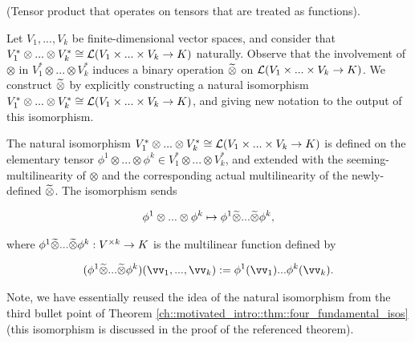\begin{deriv}
    (Tensor product that operates on tensors that are treated as functions).
    
    Let $V_1, ..., V_k$ be finite-dimensional vector spaces, and consider that $V_1^* \otimes ... \otimes V_k^* \cong \mathcal{L}(V_1 \times ... \times V_k \rightarrow K)$ naturally. Observe that the involvement of $\otimes$ in $V_1^* \otimes ... \otimes V_k^*$ induces a binary operation $\widetilde{\otimes}$ on $\mathcal{L}(V_1 \times ... \times V_k \rightarrow K)$. We construct $\widetilde{\otimes}$ by explicitly constructing a natural isomorphism $V_1^* \otimes ... \otimes V_k^*  \cong \mathcal{L}(V_1 \times ... \times V_k \rightarrow K)$, and giving new notation to the output of this isomorphism. 
    
    The natural isomorphism $V_1^* \otimes ... \otimes V_k^* \cong \mathcal{L}(V_1 \times ... \times V_k \rightarrow K)$ is defined on the elementary tensor $\phi^1 \otimes ... \otimes \phi^k \in V_1^* \otimes ... \otimes V_k^*$, and extended with the seeming-multilinearity of $\otimes$ and the corresponding actual multilinearity of the newly-defined $\widetilde{\otimes}$. The isomorphism sends
    
    
    \begin{align*}
        \phi^1 \otimes ... \otimes \phi^k \mapsto \phi^1 \widetilde{\otimes} ... \widetilde{\otimes} \phi^k,
    \end{align*}
    
    where $\phi^1 \widetilde{\otimes} ... \widetilde{\otimes} \phi^k:V^{\times k} \rightarrow K$ is the multilinear function defined by
    
    \begin{align*}
        (\phi^1 \totimes ... \totimes \phi^k)(\vv_1, ..., \vv_k) := \phi^1(\vv_1) ... \phi^k(\vv_k).
    \end{align*}
    
    Note, we have essentially reused the idea of the natural isomorphism from the third bullet point of Theorem \ref{ch::motivated_intro::thm::four_fundamental_isos} (this isomorphism is discussed in the proof of the referenced theorem).
\end{deriv}

